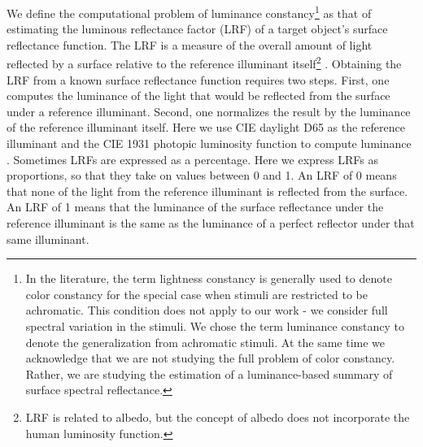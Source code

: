 \documentclass{jov}
\begin{document}
We define the computational problem of luminance constancy\footnote{In the literature, the term lightness constancy is generally used to denote color constancy for the special case when stimuli are restricted to be achromatic. This condition does not apply to our work - we consider full spectral variation in the stimuli. We chose the term luminance constancy to denote the generalization from achromatic stimuli. At the same time we acknowledge that we are not studying the full problem of color constancy. Rather, we are studying the estimation of a luminance-based summary of surface spectral reflectance.} as that of estimating the luminous reflectance factor (LRF) of a target object's surface reflectance function.
The LRF is a measure of the overall amount of light reflected by a surface relative to the reference illuminant itself\footnote{LRF is related to albedo, but the concept of albedo does not incorporate the human luminosity function.} \cite{astm1121477}.
Obtaining the LRF from a known surface reflectance function requires two steps.
First, one computes the luminance of the light that would be reflected from the surface under a reference illuminant.
Second, one normalizes the result by the luminance of the reference illuminant itself.
Here we use CIE daylight D65 as the reference illuminant and the CIE 1931 photopic luminosity function to compute luminance \cite{CIE86}.
Sometimes LRFs are expressed as a percentage.
Here we express LRFs as proportions, so that they take on values between 0 and 1. 
An LRF of 0 means that none of the light from the reference illuminant is reflected from the surface. 
An LRF of 1 means that the luminance of the surface reflectance under the reference illuminant is the same as the luminance of a perfect reflector under that same illuminant.
\end{document}
